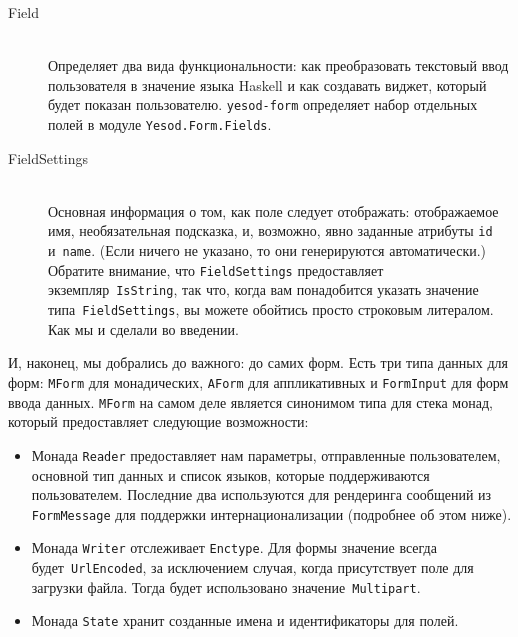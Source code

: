 \begin{description}
    \item[Field] \hfill \\
        Определяет два вида функциональности: как преобразовать текстовый ввод
        пользователя в значение языка Haskell и как создавать виджет, который
        будет показан пользователю. \texttt{yesod-form} определяет набор
        отдельных полей в модуле \lstinline'Yesod.Form.Fields'.

    \item[FieldSettings] \hfill \\
        Основная информация о том, как поле следует отображать: отображаемое
        имя, необязательная подсказка, и, возможно, явно заданные атрибуты
        \lstinline'id' и~\lstinline'name'. (Если ничего не указано, то они
        генерируются автоматически.) Обратите внимание, что
        \lstinline'FieldSettings' предоставляет экземпляр~\lstinline'IsString',
        так что, когда вам понадобится указать значение
        типа~\lstinline'FieldSettings', вы можете обойтись просто строковым
        литералом. Как мы и сделали во введении.
\end{description}

И, наконец, мы добрались до важного: до самих форм. Есть три типа данных для
форм: \lstinline'MForm' для монадических, \lstinline'AForm' для аппликативных и
\lstinline'FormInput' для форм ввода данных. \lstinline'MForm' на самом деле
является синонимом типа для стека монад, который предоставляет следующие
возможности:
\begin{itemize}
    \item Монада \lstinline'Reader' предоставляет нам параметры, отправленные
        пользователем, основной тип данных и список языков, которые
        поддерживаются пользователем. Последние два используются для рендеринга
        сообщений из \lstinline'FormMessage' для поддержки интернационализации
        (подробнее об этом ниже).

    \item Монада \lstinline'Writer' отслеживает \lstinline'Enctype'. Для формы
        значение всегда будет~\lstinline'UrlEncoded', за исключением случая,
        когда присутствует поле для загрузки файла. Тогда будет использовано
        значение~\lstinline'Multipart'.

    \item Монада \lstinline'State' хранит созданные имена и идентификаторы для
        полей.
\end{itemize}

